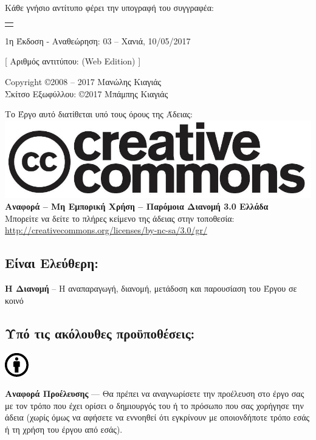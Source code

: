 %
%
\maketitle
\begin{center}
Κάθε γνήσιο αντίτυπο φέρει την υπογραφή του συγγραφέα:
\begin{tabular}{p{}}
\\
\\
\end{tabular}

\smallskip
1η Έκδοση - Αναθεώρηση: 03 -- Χανιά, 10/05/2017

[ Αριθμός αντιτύπου: (Web Edition) ]

\smallskip
Copyright \copyright 2008 -- 2017 Μανώλης Κιαγιάς\\
Σκίτσο Εξωφύλλου: \copyright 2017 Μπάμπης Κιαγιάς

Το Έργο αυτό διατίθεται υπό τους όρους της Άδειας:\\
\includegraphics[scale=0.2]{images/license/cc-logo}\\
\textbf{Αναφορά -- Μη Εμπορική Χρήση --  Παρόμοια Διανομή 3.0 Ελλάδα}\\
Μπορείτε να δείτε το πλήρες κείμενο της άδειας στην τοποθεσία:\\
\url{http://creativecommons.org/licenses/by-nc-sa/3.0/gr/}
\end{center}
\subsection*{Είναι Ελεύθερη:}

\noindent
\textbf{Η Διανομή} -- Η αναπαραγωγή, διανομή, μετάδοση και παρουσίαση του Έργου σε κοινό
\subsection*{Υπό τις ακόλουθες προϋποθέσεις:}
\vspace{1em}
\noindent
\parbox{1.5cm}{\includegraphics[scale=0.15]{images/license/cc_by_30}}
\parbox{10.5cm}{\textbf{Αναφορά Προέλευσης} — Θα πρέπει να αναγνωρίσετε την προέλευση στο έργο σας με τον τρόπο που έχει ορίσει ο δημιουργός του ή το πρόσωπο που σας χορήγησε την άδεια (χωρίς όμως να αφήσετε να εννοηθεί  ότι εγκρίνουν  με οποιονδήποτε τρόπο εσάς ή τη χρήση του έργου από εσάς).}

